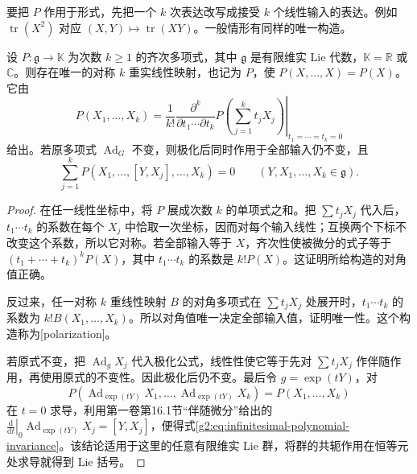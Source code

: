\ProseParagraphBreak

要把 \(P\) 作用于形式，先把一个 \(k\) 次表达改写成接受 \(k\) 个线性输入的表达。例如 \(\operatorname{tr}(X^2)\) 对应 \((X,Y)\mapsto\operatorname{tr}(XY)\)。一般情形有同样的唯一构造。

\begin{proposition}\label{g2:prop:polarization-invariance}
	设 \(P:\mathfrak g\to\mathbb K\) 为次数 \(k\ge1\) 的齐次多项式，其中 \(\mathfrak g\) 是有限维实 Lie 代数，\(\mathbb K=\mathbb R\) 或 \(\mathbb C\)。则存在唯一的对称 \(k\) 重实线性映射，也记为 \(P\)，使 \(P(X,\ldots,X)=P(X)\)。它由
	\begin{equation}\label{g2:eq:invariant-polarization}
		P(X_1,\ldots,X_k)
		=\frac1{k!}\left.\frac{\partial^k}{\partial t_1\cdots\partial t_k}
		P\!\left(\sum_{j=1}^k t_jX_j\right)\right|_{t_1=\cdots=t_k=0}
	\end{equation}
	给出。若原多项式 \(\operatorname{Ad}_G\) 不变，则极化后同时作用于全部输入仍不变，且
	\begin{equation}\label{g2:eq:infinitesimal-polynomial-invariance}
		\sum_{j=1}^kP(X_1,\ldots,[Y,X_j],\ldots,X_k)=0
		\qquad(Y,X_1,\ldots,X_k\in\mathfrak g).
	\end{equation}
\end{proposition}
\begin{proof}
	在任一线性坐标中，将 \(P\) 展成次数 \(k\) 的单项式之和。把 \(\sum t_jX_j\) 代入后，\(t_1\cdots t_k\) 的系数在每个 \(X_j\) 中恰取一次坐标，因而对每个输入线性；互换两个下标不改变这个系数，所以它对称。若全部输入等于 \(X\)，齐次性使被微分的式子等于 \((t_1+\cdots+t_k)^kP(X)\)，其中 \(t_1\cdots t_k\) 的系数是 \(k!P(X)\)。这证明所给构造的对角值正确。

	反过来，任一对称 \(k\) 重线性映射 \(B\) 的对角多项式在 \(\sum t_jX_j\) 处展开时，\(t_1\cdots t_k\) 的系数为 \(k!B(X_1,\ldots,X_k)\)。所以对角值唯一决定全部输入值，证明唯一性。这个构造称为[polarization]。

	若原式不变，把 \(\operatorname{Ad}_gX_j\) 代入极化公式，线性性使它等于先对 \(\sum t_jX_j\) 作伴随作用，再使用原式的不变性。因此极化后仍不变。最后令 \(g=\exp(tY)\)，对
	\[
		P(\operatorname{Ad}_{\exp(tY)}X_1,\ldots,\operatorname{Ad}_{\exp(tY)}X_k)
		=P(X_1,\ldots,X_k)
	\]
	在 \(t=0\) 求导，利用第一卷第16.1节“伴随微分”给出的 \(\left.\frac{\mathrm d}{\mathrm dt}\right|_0\operatorname{Ad}_{\exp(tY)}X_j=[Y,X_j]\)，便得式\eqref{g2:eq:infinitesimal-polynomial-invariance}。该结论适用于这里的任意有限维实 Lie 群，将群的共轭作用在恒等元处求导就得到 Lie 括号。
\end{proof}

